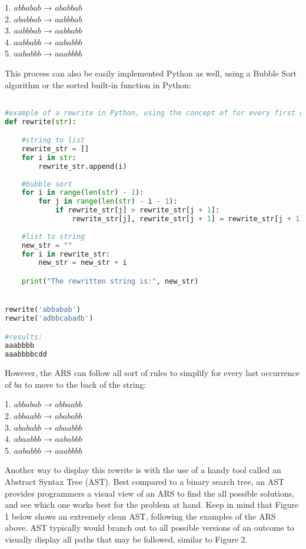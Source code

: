 \documentclass{article}
\begin{document}
\begin{center}
    1. $abbabab$ → $ababbab$ \\
    2. $ababbab$ → $aabbbab$ \\
    3. $aabbbab$ → $aabbabb$ \\
    4. $aabbabb$ → $aababbb$ \\
    5. $aababbb$ → $aaabbbb$ \\
\end{center}

\noindent
This process can also be easily implemented Python as well, using a Bubble Sort algorithm or the sorted built-in function in Python:

\begin{lstlisting}[language=python] 

#example of a rewrite in Python, using the concept of for every first occurrence of a to move to the front of the string using Bubble Sort
def rewrite(str):

    #string to list
    rewrite_str = []
    for i in str:
        rewrite_str.append(i)
    
    #bubble sort
    for i in range(len(str) - 1):
        for j in range(len(str) - i - 1):
            if rewrite_str[j] > rewrite_str[j + 1]:
                rewrite_str[j], rewrite_str[j + 1] = rewrite_str[j + 1], rewrite_str[j]
    
    #list to string
    new_str = ""
    for i in rewrite_str:
        new_str = new_str + i

    print("The rewritten string is:", new_str)


rewrite('abbabab')
rewrite('adbbcabadb')

#results:
aaabbbb
aaabbbbcdd

\end{lstlisting}

\noindent
However, the ARS can follow all sort of rules to simplify for every last occurrence of $ba$ to move to the back of the string:

\begin{center}
    1. $abbabab$ → $abbaabb$ \\
    2. $abbaabb$ → $abababb$ \\
    3. $abababb$ → $abaabbb$ \\
    4. $abaabbb$ → $aababbb$ \\
    5. $aababbb$ → $aaabbbb$ \\
\end{center}

\medskip\noindent
Another way to display this rewrite is with the use of a handy tool called an Abstract Syntax Tree (AST). Best compared to a binary search tree, an AST provides programmers a visual view of an ARS to find the all possible solutions, and see which one works best for the problem at hand. Keep in  mind that Figure 1 below shows an extremely clean AST, following the examples of the ARS above. AST typically would branch out to all possible versions of an outcome to visually display all paths that may be followed, similar to Figure 2.
\end{document}
